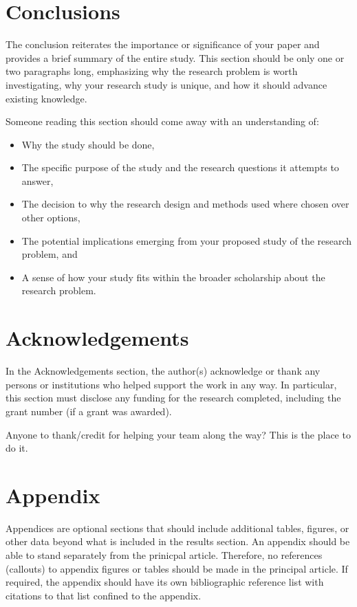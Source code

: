 \documentclass[10pt,twocolumn,letterpaper]{article}
\begin{document}
\section{Conclusions}
The conclusion reiterates the importance or significance of your paper and provides a brief summary of the entire study. This section should be only one or two paragraphs long, emphasizing why the research problem is worth investigating, why your research study is unique, and how it should advance existing knowledge.

Someone reading this section should come away with an understanding of:
\begin{itemize}
    \item Why the study should be done,
    \item The specific purpose of the study and the research questions it attempts to answer,
    \item The decision to why the research design and methods used where chosen over other options,
    \item The potential implications emerging from your proposed study of the research problem, and
    \item A sense of how your study fits within the broader scholarship about the research problem.
\end{itemize}

\section{Acknowledgements}
In the Acknowledgements section, the author(s) acknowledge or thank any persons or institutions who helped support the work in any way. In particular, this section must disclose any funding for the research completed, including the grant number (if a grant was awarded).

Anyone to thank/credit for helping your team along the way? This is the place to do it.

\section{Appendix}
Appendices are optional sections that should include additional tables, figures, or other data beyond what is included in the results section. An appendix should be able to stand separately from the prinicpal article. Therefore, no references (callouts) to appendix figures or tables should be made in the principal article. If required, the appendix should have its own bibliographic reference list with citations to that list confined to the appendix. \cite{latexcompanion}




\end{document}
